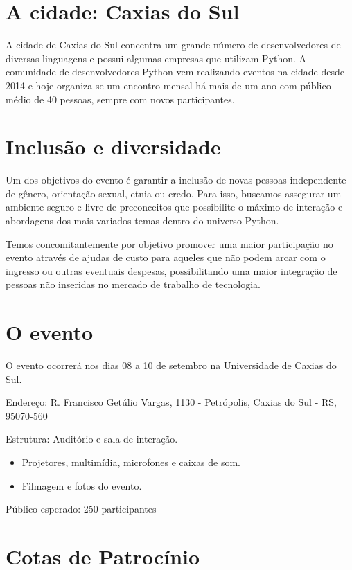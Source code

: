\documentclass[12pt]{article}
\begin{document}
\section{A cidade: Caxias do Sul}

A cidade de Caxias do Sul concentra um grande número de desenvolvedores de diversas linguagens e possui algumas empresas que utilizam Python. A comunidade de desenvolvedores Python vem realizando eventos na cidade desde 2014 e hoje organiza-se um encontro mensal há mais de um ano com público médio de 40 pessoas, sempre com novos participantes.

\section{Inclusão e diversidade}

Um dos objetivos do evento é garantir a inclusão de novas pessoas independente de gênero, orientação sexual, etnia ou credo. Para isso, buscamos assegurar um ambiente seguro e livre de preconceitos que possibilite o máximo de interação e abordagens dos mais variados temas dentro do universo Python.

Temos concomitantemente por objetivo promover uma maior participação no evento através de ajudas de custo para aqueles que não podem arcar com o ingresso ou outras eventuais despesas, possibilitando uma maior integração de pessoas não inseridas no mercado de trabalho de tecnologia.

\section{O evento}

O evento ocorrerá nos dias 08 a 10 de setembro na Universidade de Caxias do Sul.

Endereço: R. Francisco Getúlio Vargas, 1130 - Petrópolis, Caxias do Sul - RS, 95070-560

Estrutura: Auditório e sala de interação.

\begin{itemize}[label={}]
    \item Projetores, multimídia, microfones e caixas de som.
    \item Filmagem e fotos do evento.
\end{itemize}

Público esperado: 250 participantes

\section{Cotas de Patrocínio}
\end{document}
